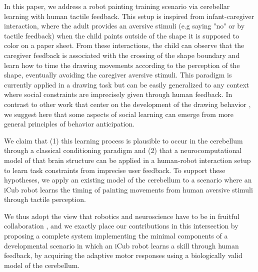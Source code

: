 \documentclass[letterpaper, 10 pt, conference]{ieeeconf}  %
\newcommand\jp[1]{{\color{red}}{\color{red}}{\footnotesize \color{red}[#1 - \textbf{Jordi}]}} %
\begin{document}
In this paper, we address a robot painting training scenario via cerebellar learning with human tactile feedback. This setup is inspired from infant-caregiver interaction, where the adult provides an aversive stimuli (e.g saying "no" or by tactile feedback) when the child paints outside of the shape it is supposed to color on a paper sheet. From these interactions, the child can observe that the caregiver feedback is associated with the crossing of the shape boundary and learn how to time the drawing movements according to the perception of the shape, eventually avoiding the caregiver aversive stimuli. This paradigm is currently applied in a drawing task but can be easily generalized to any context where social constraints are imprecisely given through human feedback. In contrast to other work that center on the development of the drawing behavior \cite{kudoh2006,nishide2015}, we suggest here that some aspects of social learning can emerge from more general principles of behavior anticipation.

We claim that (1) this learning process is plausible to occur in the cerebellum through a classical conditioning paradigm and (2) that a neurocomputational model of that brain structure can be applied in a human-robot interaction setup to learn task constraints from imprecise user feedback. To support these hypotheses, we apply an existing model of the  cerebellum  \cite{herreros2013nucleo} to a scenario where an iCub robot \cite{metta2008icub} learns the timing of painting movements from human aversive stimuli through tactile perception. %

We thus adopt the view that robotics and neuroscience have to be in fruitful collaboration \cite{floreano2014robotics}, and we exactly place our contributions in this intersection by proposing a complete system implementing the minimal components of a developmental scenario in which an iCub robot learns a skill through human feedback, by acquiring the adaptive motor responses using a biologically valid model of the cerebellum.
\end{document}
